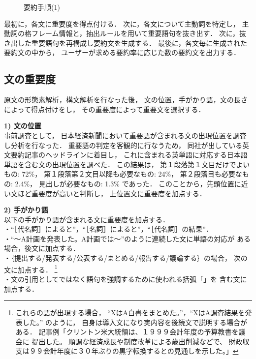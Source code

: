 \begin{figure}[!htbp]
\begin{center}
\caption{要約手順(1)}
\label{fig:flow1}
\end{center}
\end{figure}

最初に，各文に重要度を得点付ける．
次に，各文について主動詞を特定し，
主動詞の格フレーム情報と，抽出ルールを用いて重要語句を抜き出す．
次に，抜き出した重要語句を再構成し要約文を生成する．
最後に，各文毎に生成された要約文の中から，
ユーザーが求める要約率に応じた数の要約文を出力する．


\subsection{文の重要度}

原文の形態素解析，構文解析を行なった後，
文の位置，手がかり語，文の長さによって得点付けをし，
その重要度によって重要文を選択する．

\vspace{1mm}
{\bf 1) 文の位置} \\
事前調査として，
日本経済新聞において重要語が含まれる文の出現位置を調査し分析を行なった．
重要語の判定を客観的に行なうため，
同社が出している英文要約記事のヘッドラインに着目し，
これに含まれる英単語に対応する日本語単語を含む文の出現位置を調べた．
この結果は，
第１段落第１文目だけでよいもの: 72\%，
第１段落第２文目以降も必要なもの: 24\%，
第２段落目も必要なもの: 2.4\%，
見出しが必要なもの: 1.3\%
であった．
このことから，先頭位置に近い文ほど重要度が高いと判断し，
上位置文に重要度を加点する．

\vspace{1mm}
{\bf 2) 手がかり語}\\
以下の手がかり語が含まれる文に重要度を加点する．\\
・``［代名詞］によると''，``［名詞］によると''，``［代名詞］の結果''．\\
・``〜A計画を発表した。A計画では〜''のように連続した文に単語の対応が
ある場合，後文に加点する．\\
・｛提出する/発表する/公表する/まとめる/報告する/議論する｝の場合，
次の文に加点する．
\footnote{これらの語が出現する場合，
``XはA白書をまとめた。''，``XはA調査結果を発表した。'' のように，
自身は導入文になり実内容を後続文で説明する場合がある．
記事例「クリントン米大統領は、１９９９会計年度の予算教書を議会に
\underline{提出した}。
順調な経済成長や制度改革による歳出削減などで、
財政収支は９９会計年度に３０年ぶりの黒字転換するとの見通しを示した。」}\\
・文の引用としてではなく語句を強調するために使われる括弧「」を
含む文に加点する．

